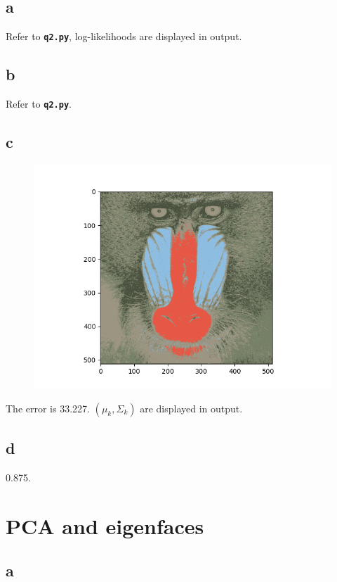 \documentclass{article}
\begin{document}
\subsection*{a}

Refer to \textbf{\texttt{q2.py}}, log-likelihoods are displayed in output.

\subsection*{b}

Refer to \textbf{\texttt{q2.py}}.

\subsection*{c}

\begin{figure}[htbp]
    \centering
    \includegraphics[width=.6\textwidth]{q2.png}
\end{figure}
The error is 33.227. $(\mu_k, \Sigma_k)$ are displayed in output. 

\subsection*{d}

0.875.

\newpage

\section{PCA and eigenfaces}

\subsection*{a}
\end{document}
